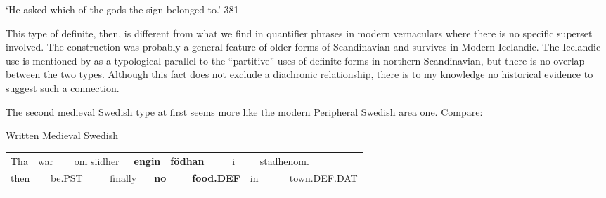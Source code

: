 \begin{styleTranslation}
‘He asked which of the gods the sign belonged to.’ 381

\end{styleTranslation}

\begin{styleBodyTextFirst}
This type of definite, then, is different from what we find in quantifier phrases in modern vernaculars where there is no specific superset involved. The construction was probably a general feature of older forms of Scandinavian and survives in Modern Icelandic. The Icelandic use is mentioned by \citet{Riesler2002} as a typological parallel to the “partitive” uses of definite forms in northern Scandinavian, but there is no overlap between the two types. Although this fact does not exclude a diachronic relationship, there is to my knowledge no historical evidence to suggest such a connection.

\end{styleBodyTextFirst}

\begin{styleBodytextC}
The second medieval Swedish type at first seems more like the modern Peripheral Swedish area one. Compare:

\end{styleBodytextC}


\begin{listWWNumileveli}
\item {}

\begin{styleExample}
\label{bkm:Ref78603361}Written Medieval Swedish

\end{styleExample}

\end{listWWNumileveli}

\begin{tabular}{llllllllllllll}
\lsptoprule
Tha & \multicolumn{2}{l}{war

} & \multicolumn{2}{l}{om siidher

} & \multicolumn{2}{l}{{\bfseries engin}

} & \multicolumn{2}{l}{{\bfseries födhan}

} & \multicolumn{2}{l}{i

} & \multicolumn{2}{l}{stadhenom.

} & \\
\multicolumn{2}{l}{then

} & \multicolumn{2}{l}{be.PST

} & \multicolumn{2}{l}{finally

} & \multicolumn{2}{l}{{\bfseries no}

} & \multicolumn{2}{l}{{\bfseries food.DEF}

} & \multicolumn{2}{l}{in

} & \multicolumn{2}{l}{town.DEF.DAT

}\\
\lspbottomrule
\end{tabular}


